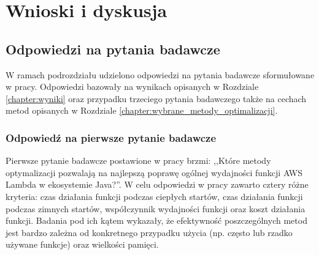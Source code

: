 \chapter{Wnioski i dyskusja}\label{chapter:wnioski_dyskusja}

\section{Odpowiedzi na pytania badawcze}\label{chapter:odpowiedzi_na_pytania_badawcze}

W ramach podrozdziału udzielono odpowiedzi na pytania badawcze sformułowane w pracy. 
Odpowiedzi bazowały na wynikach opisanych w Rozdziale \ref{chapter:wyniki} oraz przypadku trzeciego pytania badawczego także na cechach metod opisanych w Rozdziale \ref{chapter:wybrane_metody_optimalizacji}.

\subsection*{Odpowiedź na pierwsze pytanie badawcze}

Pierwsze pytanie badawcze postawione w pracy brzmi: ,,Które metody optymalizacji pozwalają na najlepszą poprawę ogólnej wydajności funkcji AWS Lambda w ekosystemie Java?''.
W celu odpowiedzi w pracy zawarto cztery różne kryteria: czas działania funkcji podczas ciepłych startów, czas działania funkcji podczas zimnych startów, współczynnik wydajności funkcji oraz koszt działania funkcji.
Badania pod ich kątem wykazały, że efektywność poszczególnych metod jest bardzo zależna od konkretnego przypadku użycia (np. często lub rzadko używane funkcje) oraz wielkości pamięci.

